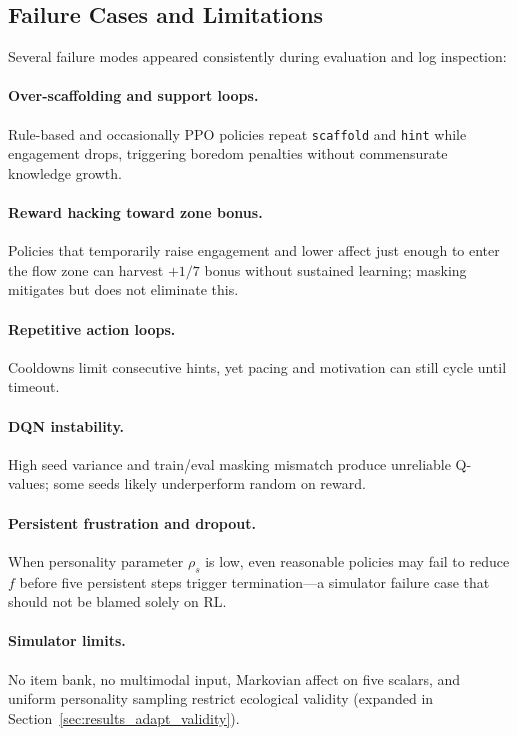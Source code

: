 \subsection{Failure Cases and Limitations}\label{sec:results_adapt_failures}

Several failure modes appeared consistently during evaluation and log inspection:

\paragraph{Over-scaffolding and support loops.} Rule-based and occasionally PPO policies repeat \texttt{scaffold} and \texttt{hint} while engagement drops, triggering boredom penalties without commensurate knowledge growth.

\paragraph{Reward hacking toward zone bonus.} Policies that temporarily raise engagement and lower affect just enough to enter the flow zone can harvest $+1/7$ bonus without sustained learning; masking mitigates but does not eliminate this.

\paragraph{Repetitive action loops.} Cooldowns limit consecutive hints, yet pacing and motivation can still cycle until timeout.

\paragraph{DQN instability.} High seed variance and train/eval masking mismatch produce unreliable Q-values; some seeds likely underperform random on reward.

\paragraph{Persistent frustration and dropout.} When personality parameter $\rho_s$ is low, even reasonable policies may fail to reduce $f$ before five persistent steps trigger termination---a simulator failure case that should not be blamed solely on RL.

\paragraph{Simulator limits.} No item bank, no multimodal input, Markovian affect on five scalars, and uniform personality sampling restrict ecological validity (expanded in Section~\ref{sec:results_adapt_validity}).

